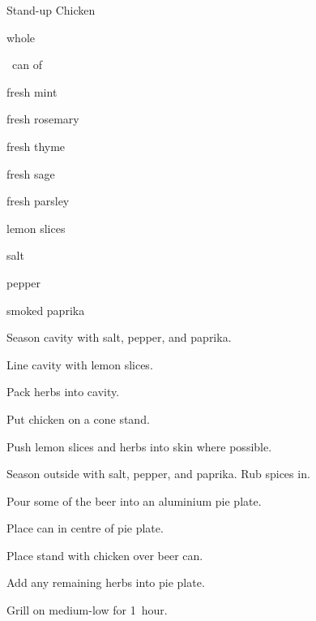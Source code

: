\begin{recipe}{Stand-up Chicken}{}{}

\begin{ingredients}
\item whole 
\item \half~can of 
\item fresh mint
\item fresh rosemary
\item fresh thyme
\item fresh sage
\item fresh parsley
\item lemon slices
\item salt
\item pepper
\item smoked paprika
\end{ingredients}

\begin{directions}
\item Season cavity with salt, pepper, and paprika.
\item Line cavity with lemon slices.
\item Pack herbs into cavity.
\item Put chicken on a cone stand.
\item Push lemon slices and herbs into skin where possible.
\item Season outside with salt, pepper, and paprika. Rub spices in.
\item Pour some of the beer into an aluminium pie plate.
\item Place can in centre of pie plate.
\item Place stand with chicken over beer can.
\item Add any remaining herbs into pie plate.
\item Grill on medium-low for 1~hour.
\end{directions}

\end{recipe}
